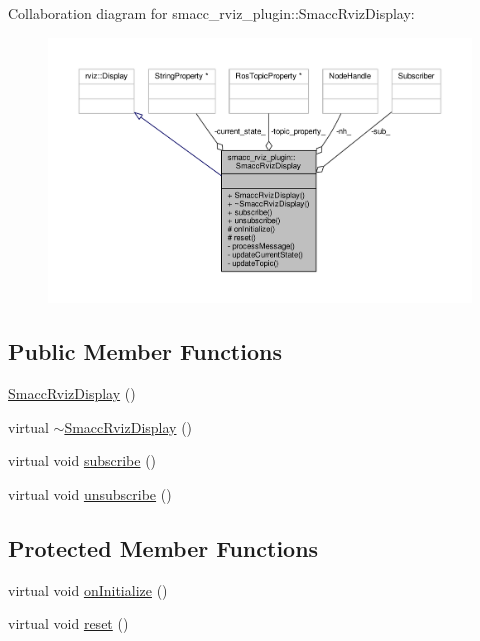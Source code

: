 Collaboration diagram for smacc\+\_\+rviz\+\_\+plugin\+:\+:Smacc\+Rviz\+Display\+:\nopagebreak
\begin{figure}[H]
\begin{center}
\leavevmode
\includegraphics[width=350pt]{classsmacc__rviz__plugin_1_1SmaccRvizDisplay__coll__graph}
\end{center}
\end{figure}
\subsection*{Public Member Functions}
\begin{DoxyCompactItemize}
\item 
\hyperlink{classsmacc__rviz__plugin_1_1SmaccRvizDisplay_a57d912b6eeec19a0654546bb011fb593}{Smacc\+Rviz\+Display} ()
\item 
virtual \hyperlink{classsmacc__rviz__plugin_1_1SmaccRvizDisplay_aebda19712c75b75a31e90272f472a7e3}{$\sim$\+Smacc\+Rviz\+Display} ()
\item 
virtual void \hyperlink{classsmacc__rviz__plugin_1_1SmaccRvizDisplay_ad774027ba3eda277c991619332495cbb}{subscribe} ()
\item 
virtual void \hyperlink{classsmacc__rviz__plugin_1_1SmaccRvizDisplay_a49a35acd10a664a8335ef5852f8c115c}{unsubscribe} ()
\end{DoxyCompactItemize}
\subsection*{Protected Member Functions}
\begin{DoxyCompactItemize}
\item 
virtual void \hyperlink{classsmacc__rviz__plugin_1_1SmaccRvizDisplay_a8a041fe0d0e88fa0219204c85831d10e}{on\+Initialize} ()
\item 
virtual void \hyperlink{classsmacc__rviz__plugin_1_1SmaccRvizDisplay_af9cf4f5ef4f5fdb2fcb1bf1a81cdac4d}{reset} ()
\end{DoxyCompactItemize}
